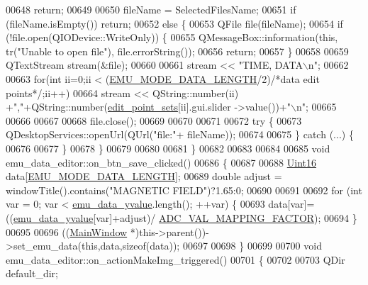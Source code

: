 \begin{DoxyCode}
{00648         \textcolor{keywordflow}{return};
00649 
00650      fileName = SelectedFilesName;
00651     \textcolor{keywordflow}{if} (fileName.isEmpty()) \textcolor{keywordflow}{return};
00652     \textcolor{keywordflow}{else} \{
00653         QFile file(fileName);
00654         \textcolor{keywordflow}{if} (!file.open(QIODevice::WriteOnly)) \{
00655             QMessageBox::information(\textcolor{keyword}{this}, tr(\textcolor{stringliteral}{"Unable to open file"}), file.errorString());
00656             \textcolor{keywordflow}{return};
00657         \}
00658 
00659         QTextStream stream(&file);
00660 
00661         stream << \textcolor{stringliteral}{"TIME, DATA\(\backslash\)n"};
00662 
00663         \textcolor{keywordflow}{for}(\textcolor{keywordtype}{int} ii=0;ii < (\hyperlink{a00003_af4c3a8ad94feb4d7bda7f107f34baf41}{EMU\_MODE\_DATA\_LENGTH}/2)\textcolor{comment}{/*data edit points*/};ii++)
00664            stream << QString::number(ii) +\textcolor{stringliteral}{","}+QString::number(\hyperlink{a00004_ab093b86d07b4eb96c36878089a7d97df}{edit\_point\_sets}[ii].gui.slider
      ->value())+\textcolor{stringliteral}{"\(\backslash\)n"};
00665 
00666 
00667 
00668         file.close();
00669 
00670 
00671 
00672         \textcolor{keywordflow}{try} \{
00673             QDesktopServices::openUrl(QUrl(\textcolor{stringliteral}{"file:"}+ fileName));
00674 
00675         \} \textcolor{keywordflow}{catch} (...) \{
00676 
00677         \}
00678     \}
00679 
00680 
00681 \}
00682 
00683 
00684 
00685 \textcolor{keywordtype}{void} emu\_data\_editor::on\_btn\_save\_clicked()
00686 \{
00687 
00688     \hyperlink{a00001_aae7407b021d43f7193a81a58cfb3e297}{Uint16} data[\hyperlink{a00003_af4c3a8ad94feb4d7bda7f107f34baf41}{EMU\_MODE\_DATA\_LENGTH}];
00689     \textcolor{keywordtype}{double} adjust = windowTitle().contains(\textcolor{stringliteral}{"MAGNETIC FIELD"})?1.65:0;
00690 
00691 
00692     \textcolor{keywordflow}{for} (\textcolor{keywordtype}{int} var = 0; var < \hyperlink{a00004_ad922d05d1e988d84f404c115fe909f72}{emu\_data\_yvalue}.length(); ++var) \{
00693          data[var]=((\hyperlink{a00004_ad922d05d1e988d84f404c115fe909f72}{emu\_data\_yvalue}[var]+adjust)/
      \hyperlink{a00031_ada92d3eeeec0cbeee41e76a52d145792}{ADC\_VAL\_MAPPING\_FACTOR});
00694     \}
00695 
00696     ((\hyperlink{a00006}{MainWindow} *)this->parent())->set\_emu\_data(\textcolor{keyword}{this},data,\textcolor{keyword}{sizeof}(data));
00697 
00698 \}
00699 
00700 \textcolor{keywordtype}{void} emu\_data\_editor::on\_actionMakeImg\_triggered()
00701 \{
00702 
00703     QDir default\_dir;
}
\end{DoxyCode}
